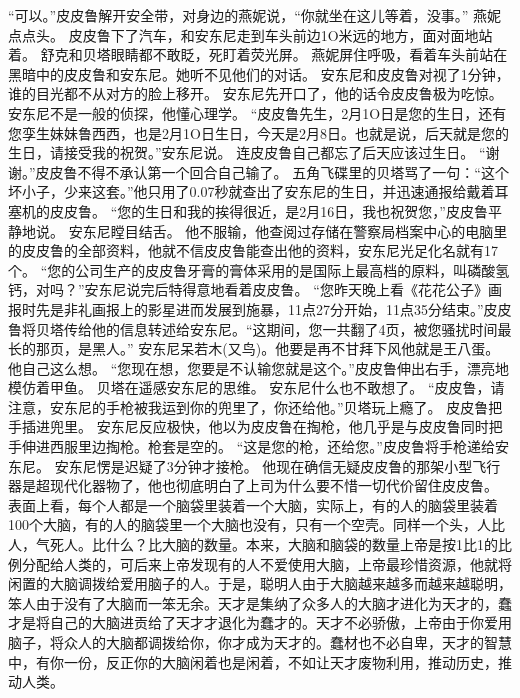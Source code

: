 \documentclass[a4paper,12pt,UTF8,twoside]{ctexbook}
\begin{document}
        “可以。”皮皮鲁解开安全带，对身边的燕妮说，“你就坐在这儿等着，没事。” 
        燕妮点点头。 
        皮皮鲁下了汽车，和安东尼走到车头前边1O米远的地方，面对面地站着。 
        舒克和贝塔眼睛都不敢眨，死盯着荧光屏。 
        燕妮屏住呼吸，看着车头前站在黑暗中的皮皮鲁和安东尼。她听不见他们的对话。 
        安东尼和皮皮鲁对视了1分钟，谁的目光都不从对方的脸上移开。 
        安东尼先开口了，他的话令皮皮鲁极为吃惊。安东尼不是一般的侦探，他懂心理学。 
        “皮皮鲁先生，2月1O日是您的生日，还有您孪生妹妹鲁西西，也是2月1O日生日，今天是2月8日。也就是说，后天就是您的生日，请接受我的祝贺。”安东尼说。 
        连皮皮鲁自己都忘了后天应该过生日。 
        “谢谢。”皮皮鲁不得不承认第一个回合自己输了。 
        五角飞碟里的贝塔骂了一句：“这个坏小子，少来这套。”他只用了0.07秒就查出了安东尼的生日，并迅速通报给戴着耳塞机的皮皮鲁。 
        “您的生日和我的挨得很近，是2月16日，我也祝贺您，”皮皮鲁平静地说。 
        安东尼瞠目结舌。 
        他不服输，他查阅过存储在警察局档案中心的电脑里的皮皮鲁的全部资料，他就不信皮皮鲁能查出他的资料，安东尼光足化名就有17个。 
        “您的公司生产的皮皮鲁牙膏的膏体采用的是国际上最高档的原料，叫磷酸氢钙，对吗？”安东尼说完后特得意地看着皮皮鲁。 
        “您昨天晚上看《花花公子》画报时先是非礼画报上的影星进而发展到施暴，11点27分开始，11点35分结束。”皮皮鲁将贝塔传给他的信息转述给安东尼。“这期间，您一共翻了4页，被您骚扰时间最长的那页，是黑人。” 
        安东尼呆若木(又鸟)。他要是再不甘拜下风他就是王八蛋。他自己这么想。 
        “您现在想，您要是不认输您就是这个。”皮皮鲁伸出右手，漂亮地模仿着甲鱼。 
        贝塔在遥感安东尼的思维。 
        安东尼什么也不敢想了。 
        “皮皮鲁，请注意，安东尼的手枪被我运到你的兜里了，你还给他。”贝塔玩上瘾了。 
        皮皮鲁把手插进兜里。 
        安东尼反应极快，他以为皮皮鲁在掏枪，他几乎是与皮皮鲁同时把手伸进西服里边掏枪。枪套是空的。 
        “这是您的枪，还给您。”皮皮鲁将手枪递给安东尼。 
        安东尼愣是迟疑了3分钟才接枪。 
        他现在确信无疑皮皮鲁的那架小型飞行器是超现代化器物了，他也彻底明白了上司为什么要不惜一切代价留住皮皮鲁。 
        表面上看，每个人都是一个脑袋里装着一个大脑，实际上，有的人的脑袋里装着100个大脑，有的人的脑袋里一个大脑也没有，只有一个空壳。同样一个头，人比人，气死人。比什么？比大脑的数量。本来，大脑和脑袋的数量上帝是按1比1的比例分配给人类的，可后来上帝发现有的人不爱使用大脑，上帝最珍惜资源，他就将闲置的大脑调拨给爱用脑子的人。于是，聪明人由于大脑越来越多而越来越聪明，笨人由于没有了大脑而一笨无余。天才是集纳了众多人的大脑才进化为天才的，蠢才是将自己的大脑进贡给了天才才退化为蠢才的。天才不必骄傲，上帝由于你爱用脑子，将众人的大脑都调拨给你，你才成为天才的。蠢材也不必自卑，天才的智慧中，有你一份，反正你的大脑闲着也是闲着，不如让天才废物利用，推动历史，推动人类。 
\end{document}
